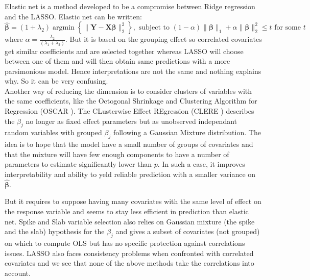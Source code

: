 \documentclass[11pt,a4paper]{article}
\begin{document}
	Elastic net\cite{zou2005regularization}	is a method developed to be a compromise between Ridge regression and the \textsc{LASSO}. 
	Elastic net can be written:
	\begin{equation}
		\boldsymbol{\hat{\beta}}=(1+\lambda_2) \operatorname{argmin}\left\lbrace \parallel \boldsymbol{Y}-\boldsymbol{X\beta} \parallel_2^2 \right\rbrace, \textrm{ subject to } (1-\alpha)\parallel\boldsymbol{\beta}\parallel_1+\alpha\parallel\boldsymbol{\beta}\parallel_2^2\leq t \textrm{ for some } t
	\end{equation}
	where $\alpha=\frac{\lambda_2}{(\lambda_1+\lambda_2)}$. 
	But it is based on the grouping effect so correlated covariates get similar coefficients and are selected together whereas LASSO will choose between one of them and will then obtain same predictions with a more parsimonious model. Hence interpretations are not the same and nothing explains why. So it can be very confusing. 
	\\
	
	Another way of reducing the dimension is to consider clusters of variables with the same coefficients, like the Octogonal Shrinkage and Clustering Algorithm for Regression (\textsc{OSCAR} \cite{bondell2008simultaneous}).
	The CLusterwise Effect REgression (\textsc{CLERE} \cite{yengo2012variable}) describes the $\beta_j$ no longer as fixed effect parameters but as unobserved independant random variables with grouped $\beta_j$ following a Gaussian Mixture distribution. The idea is to hope that the model have a small number of groups of covariates and that the mixture will have few enough components to have a number of parameters to estimate significantly lower than $p$. In such a case, it improves interpretability and ability to yeld reliable prediction with a smaller variance on $\boldsymbol{\hat{\beta}}$. 
	
	But it requires to suppose having many covariates with the same level of effect on the response variable and seems to stay less efficient in prediction than elastic net. Spike and Slab variable selection \cite{ishwaran2005spike} also relies on Gaussian mixture (the spike and the slab) hypothesis for the $\beta_j$ and gives a subset of covariates (not grouped) on which to compute \textsc{OLS} but has no specific protection against correlations issues.
	 \textsc{LASSO} also faces consistency problems \cite{Zhao2006MSC} when confronted  with correlated covariates and we see that none of the above methods take the correlations into account.
\end{document}
